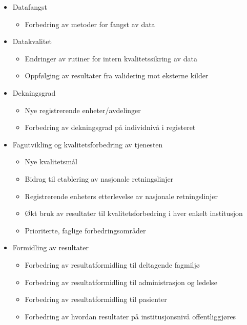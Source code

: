 \documentclass[norsk, a4paper, twocolumn]{report}
\begin{document}
\begin{itemize}
	\item Datafangst
	\begin{itemize}
		\item Forbedring av metoder for fangst av data
	\end{itemize}
	  \item Datakvalitet
	    \begin{itemize}
	      \item Endringer av rutiner for intern kvalitetssikring av data
	      \item Oppfølging av resultater fra validering mot eksterne kilder
	    \end{itemize}
	
  \item Dekningsgrad
    \begin{itemize}
      \item Nye registrerende enheter/avdelinger
      \item Forbedring av dekningsgrad på individnivå i registeret
    \end{itemize}
      \item Fagutvikling og kvalitetsforbedring av tjenesten
        \begin{itemize}
          \item Nye kvalitetsmål
          \item Bidrag til etablering av nasjonale retningslinjer
          \item Registrerende enheters etterlevelse av nasjonale retningslinjer
          \item Økt bruk av resultater til kvalitetsforbedring i hver enkelt institusjon
          \item Prioriterte, faglige forbedringsområder
        \end{itemize}
  \item Formidling av resultater
    \begin{itemize}
      \item Forbedring av resultatformidling til deltagende fagmiljø
      \item Forbedring av resultatformidling til administrasjon og ledelse
      \item Forbedring av resultatformidling til pasienter
      \item Forbedring av hvordan resultater på institusjonsnivå offentliggjøres
    \end{itemize}


\end{itemize}
\end{document}
